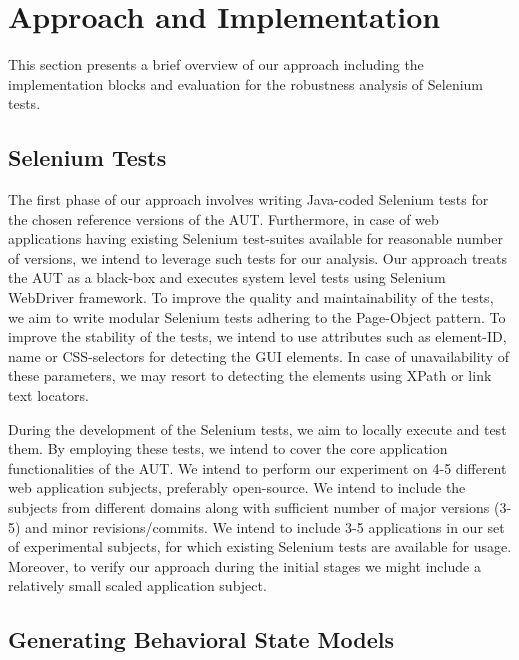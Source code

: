 \chapter{Approach and Implementation} %

\label{Chapter5} %


This section presents a brief overview of our approach including the  implementation blocks and evaluation for the robustness analysis of Selenium tests.

\section{Selenium Tests}
\label{sec:WritingTests}
\vspace{-2mm} The first phase of our approach involves writing Java-coded Selenium tests for the chosen reference versions of the AUT. Furthermore, in case of web applications having existing Selenium test-suites available for reasonable number of versions, we intend to leverage such tests for our analysis. Our approach treats the AUT as a black-box and executes system level tests using Selenium WebDriver framework. To improve the quality and maintainability of the tests, we aim to write modular Selenium tests adhering to the Page-Object pattern. To improve the stability of the tests, we intend to use attributes such as element-ID, name or CSS-selectors for detecting the GUI elements. In case of unavailability of these parameters, we may resort to detecting the elements using XPath or link text locators. 

During the development of the Selenium tests, we aim to locally execute and test them.  By employing these tests, we intend to cover the core application functionalities of the AUT. We intend to perform our experiment on 4-5 different web application subjects, preferably open-source. We intend to include the subjects from different domains along with sufficient number of major versions (3-5) and minor revisions/commits. We intend to include 3-5 applications in our set of experimental subjects, for which existing Selenium tests are available for usage. Moreover, to verify our approach during the initial stages we might include a relatively small scaled application subject.

\section{Generating Behavioral State Models}
\label{sec:BehavModels}

